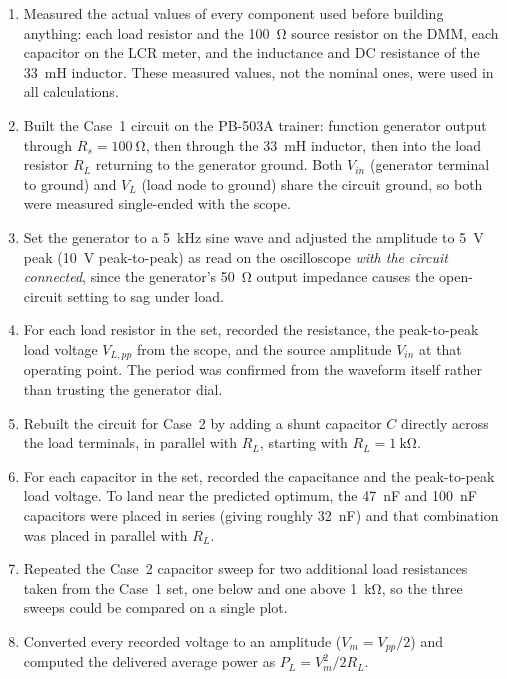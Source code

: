 \documentclass[11pt]{article}
\begin{document}
\begin{enumerate}
    \item Measured the actual values of every component used before building
          anything: each load resistor and the \SI{100}{\ohm} source resistor
          on the DMM, each capacitor on the LCR meter, and the inductance and
          DC resistance of the \SI{33}{\milli\henry} inductor. These measured
          values, not the nominal ones, were used in all calculations.

    \item Built the Case~1 circuit on the PB-503A trainer: function generator
          output through $R_s = \SI{100}{\ohm}$, then through the
          \SI{33}{\milli\henry} inductor, then into the load resistor $R_L$
          returning to the generator ground. Both $V_{in}$ (generator terminal
          to ground) and $V_L$ (load node to ground) share the circuit ground,
          so both were measured single-ended with the scope.

    \item Set the generator to a \SI{5}{\kilo\hertz} sine wave and adjusted the
          amplitude to \SI{5}{\volt} peak (\SI{10}{\volt} peak-to-peak) as read
          on the oscilloscope \emph{with the circuit connected}, since the
          generator's \SI{50}{\ohm} output impedance causes the open-circuit
          setting to sag under load.

    \item For each load resistor in the set, recorded the resistance, the
          peak-to-peak load voltage $V_{L,pp}$ from the scope, and the source
          amplitude $V_{in}$ at that operating point. The period was confirmed
          from the waveform itself rather than trusting the generator dial.

    \item Rebuilt the circuit for Case~2 by adding a shunt capacitor $C$
          directly across the load terminals, in parallel with $R_L$, starting
          with $R_L = \SI{1}{\kilo\ohm}$.

    \item For each capacitor in the set, recorded the capacitance and the
          peak-to-peak load voltage. To land near the predicted optimum, the
          \SI{47}{\nano\farad} and \SI{100}{\nano\farad} capacitors were placed
          in series (giving roughly \SI{32}{\nano\farad}) and that combination
          was placed in parallel with $R_L$.

    \item Repeated the Case~2 capacitor sweep for two additional load
          resistances taken from the Case~1 set, one below and one above
          \SI{1}{\kilo\ohm}, so the three sweeps could be compared on a single
          plot.

    \item Converted every recorded voltage to an amplitude ($V_m = V_{pp}/2$)
          and computed the delivered average power as $P_L = V_m^2/2R_L$.
\end{enumerate}
\end{document}
